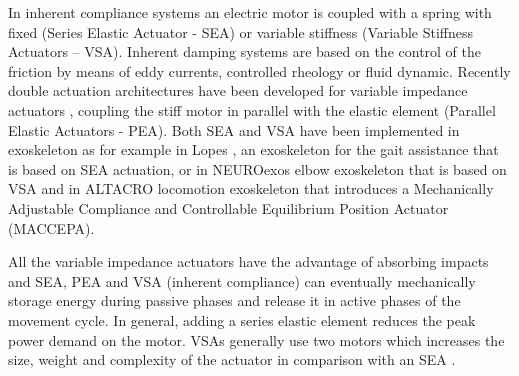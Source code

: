 \par In inherent compliance systems an electric motor is coupled with a spring with fixed (Series Elastic Actuator - SEA) or variable stiffness (Variable Stiffness Actuators – VSA). Inherent damping systems are based on the control of the friction by means of eddy currents, controlled rheology or fluid dynamic. Recently double actuation architectures have been developed for variable impedance actuators	\cite{tagliamonte2012double}, coupling the stiff motor in parallel with the elastic element (Parallel Elastic Actuators - PEA).  Both SEA and VSA have been implemented in exoskeleton as for example in Lopes \cite{veneman2007design}, an exoskeleton for the gait assistance that is based on SEA actuation, or in NEUROexos elbow exoskeleton \cite{vitiello2013neuroexos} that is based on VSA and in ALTACRO locomotion exoskeleton \cite{cherelle2010maccepa} that introduces a Mechanically Adjustable Compliance and Controllable Equilibrium Position Actuator (MACCEPA).
\par All the variable impedance actuators have the advantage of absorbing impacts and SEA, PEA and VSA (inherent compliance) can eventually mechanically storage energy during passive phases and release it in active phases of the movement cycle. In general, adding a series elastic element reduces the peak power demand on the motor.  VSAs generally use two motors which increases the size, weight and complexity of the actuator in comparison with an SEA \cite{wolf2011dlr}.

